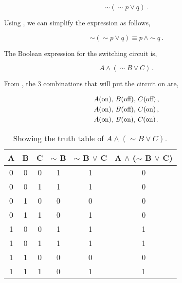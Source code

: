 \begin{subquestions}
\begin{subsubquestions}
\begin{equation}
	\sim(\sim p \lor q)\,.
\end{equation}

\subsubquestion

Using , we can simplify the expression as follows,

\begin{equation}
		\sim(\sim p \lor q) \equiv p \, \land \sim q\,.
\end{equation}

\end{subsubquestions}


\subquestion

\begin{subsubquestions}

\subsubquestion

The Boolean expression for the switching circuit is,

\begin{equation}
	A \land (\sim B \lor C)\,.
\end{equation}

\subsubquestion

From , the 3 combinations that will put the circuit on are,

\begin{align}
	& A (\text{on}),\, B (\text{off}),\, C (\text{off})\,, \nonumber \\
	& A (\text{on}),\, B (\text{off}),\, C (\text{on})\,, \nonumber \\
	& A (\text{on}),\, B (\text{on}),\, C (\text{on})\,.
\end{align}

\begin{table}[ht]
	\centering
	\begin{tabular}{|c|c|c|c|c|c|}
		\hline
		A & B & C & $\sim$ B & $\sim$ B $\lor$ C & A $\land$ ($\sim$ B $\lor$ C) \\
		\hline
		0 & 0 & 0 & 1 & 1 & 0 \\
		0 & 0 & 1 & 1 & 1 & 0 \\
		0 & 1 & 0 & 0 & 0 & 0 \\
		0 & 1 & 1 & 0 & 1 & 0 \\
		1 & 0 & 0 & 1 & 1 & 1 \\
		1 & 0 & 1 & 1 & 1 & 1 \\
		1 & 1 & 0 & 0 & 0 & 0 \\
		1 & 1 & 1 & 0 & 1 & 1 \\
		\hline
	\end{tabular}
	\caption{\label{2012:q2:TruthTab3} Showing the truth table of $A \land (\sim B \lor C)$.}
\end{table}


\end{subsubquestions}
\end{subquestions}
